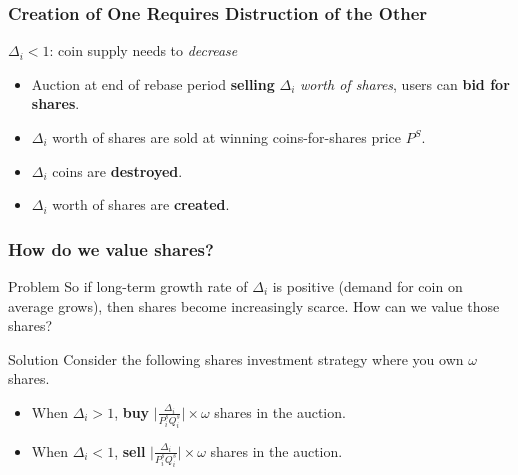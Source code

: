 \documentclass{beamer}
\begin{document}
\begin{frame}
  \frametitle{Creation of One Requires Distruction of the Other}
  \begin{block}{$\Delta_{i} < 1$: coin supply needs to \emph{decrease}}
      
    \begin{itemize}
    \item Auction at end of rebase period \textbf{selling} $\Delta_{i}$
      \emph{worth of shares}, users can \textbf{bid for shares}.
    \item $\Delta_{i}$ worth of shares are sold at winning
      coins-for-shares price $P^{S}$.
    \item $\Delta_{i}$ coins are \textbf{destroyed}.
    \item $\Delta_{i}$ worth of shares are \textbf{created}.
    \end{itemize}

  \end{block}

\end{frame}

\begin{frame}
  \frametitle{How do we value shares?}

  \begin{block}{Problem}
    So if long-term growth rate of $\Delta_{i}$ is positive (demand
    for coin on average grows), then shares become increasingly
    scarce. How can we value those shares? 
  \end{block}

  \begin{block}{Solution}
    Consider the following shares investment strategy where you own
    $\omega$ shares. 
    \newcommand*{\Fraction}{\lvert\frac{\Delta_{i}}{P^{s}_{i}Q^{s}_{i}}\rvert}%
    \begin{itemize}
    \item When $\Delta_{i} > 1$, \textbf{buy}
      $\Fraction \times \omega$ shares in the auction.
    \item When $\Delta_{i} < 1$, \textbf{sell}
      $\Fraction \times \omega$ shares in the auction.
    \end{itemize}
  \end{block}

\end{frame}
\end{document}
